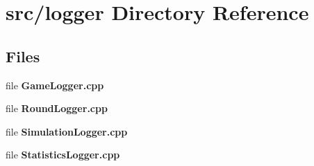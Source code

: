 \section{src/logger Directory Reference}
\label{dir_ffde1fbcaa8d6b0d34e29c3bddf7a801}
\subsection*{Files}
\begin{DoxyCompactItemize}
\item 
file {\bfseries Game\-Logger.\-cpp}
\item 
file {\bfseries Round\-Logger.\-cpp}
\item 
file {\bfseries Simulation\-Logger.\-cpp}
\item 
file {\bfseries Statistics\-Logger.\-cpp}
\end{DoxyCompactItemize}
